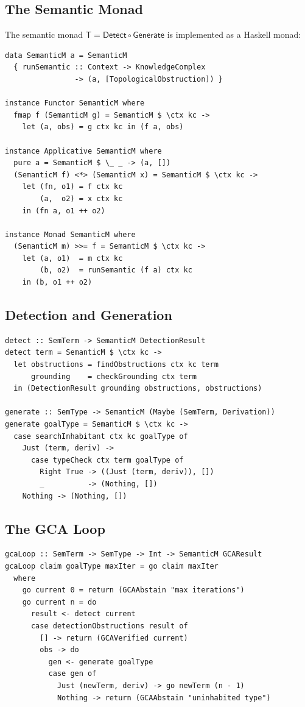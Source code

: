 \documentclass[11pt,a4paper]{article}
\theoremstyle{plain}
\theoremstyle{definition}
\theoremstyle{remark}
\newcommand{\Detect}{\mathsf{Detect}}
\newcommand{\Generate}{\mathsf{Generate}}
\newcommand{\SemanticT}{\mathsf{T}}
\begin{document}
\subsection{The Semantic Monad}

The semantic monad $\SemanticT = \Detect \circ \Generate$ is implemented as a Haskell monad:

\begin{lstlisting}[caption={The Semantic Monad}]
data SemanticM a = SemanticM
  { runSemantic :: Context -> KnowledgeComplex
                -> (a, [TopologicalObstruction]) }

instance Functor SemanticM where
  fmap f (SemanticM g) = SemanticM $ \ctx kc ->
    let (a, obs) = g ctx kc in (f a, obs)

instance Applicative SemanticM where
  pure a = SemanticM $ \_ _ -> (a, [])
  (SemanticM f) <*> (SemanticM x) = SemanticM $ \ctx kc ->
    let (fn, o1) = f ctx kc
        (a,  o2) = x ctx kc
    in (fn a, o1 ++ o2)

instance Monad SemanticM where
  (SemanticM m) >>= f = SemanticM $ \ctx kc ->
    let (a, o1)  = m ctx kc
        (b, o2)  = runSemantic (f a) ctx kc
    in (b, o1 ++ o2)
\end{lstlisting}

\subsection{Detection and Generation}

\begin{lstlisting}[caption={Detection and generation functions}]
detect :: SemTerm -> SemanticM DetectionResult
detect term = SemanticM $ \ctx kc ->
  let obstructions = findObstructions ctx kc term
      grounding    = checkGrounding ctx term
  in (DetectionResult grounding obstructions, obstructions)

generate :: SemType -> SemanticM (Maybe (SemTerm, Derivation))
generate goalType = SemanticM $ \ctx kc ->
  case searchInhabitant ctx kc goalType of
    Just (term, deriv) ->
      case typeCheck ctx term goalType of
        Right True -> ((Just (term, deriv)), [])
        _          -> (Nothing, [])
    Nothing -> (Nothing, [])
\end{lstlisting}

\subsection{The GCA Loop}

\begin{lstlisting}[caption={Generate-Check-Abstain loop}]
gcaLoop :: SemTerm -> SemType -> Int -> SemanticM GCAResult
gcaLoop claim goalType maxIter = go claim maxIter
  where
    go current 0 = return (GCAAbstain "max iterations")
    go current n = do
      result <- detect current
      case detectionObstructions result of
        [] -> return (GCAVerified current)
        obs -> do
          gen <- generate goalType
          case gen of
            Just (newTerm, deriv) -> go newTerm (n - 1)
            Nothing -> return (GCAAbstain "uninhabited type")
\end{lstlisting}
\end{document}
